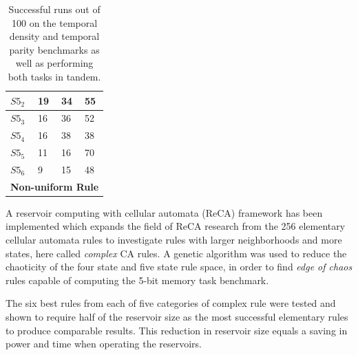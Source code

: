 \documentclass{elsarticle}
\begin{document}
\begin{multicols}{2}
\begin{table}[H]
\begin{tabular}{|l|l|l|l|}
$S5_{2}$ & 19 & 34 & 55 \\ \hline
$S5_{3}$ & 16 & 36 & 52 \\ \hline
$S5_{4}$ & 16 & 38 & 38 \\ \hline
$S5_{5}$ & 11 & 16 & 70 \\ \hline
$S5_{6}$ & 9 & 15 & 48 \\ \hline
\multicolumn{4}{|l|}{\textbf{Non-uniform Rule}} \\ \hline
\end{tabular}
\caption{Successful runs out of 100 on the temporal density and temporal parity 
   benchmarks as well as performing both tasks in tandem.
}
\label{table:results_temp_dens}
\end{table}

A reservoir computing with cellular automata (ReCA) framework has been 
implemented which expands the field of ReCA research from the 256 elementary 
cellular automata rules to investigate rules with larger neighborhoods and more 
states, here called \textit{complex} CA rules. A genetic algorithm was used to 
reduce the chaoticity of the four state and five state rule space, in order to 
find \textit{edge of chaos} rules capable of computing the 5-bit memory task 
benchmark. \par The six best rules from each of five categories of complex rule 
were tested and shown to require half of the reservoir size as the most 
successful elementary rules to produce comparable results. This reduction in 
reservoir size equals a saving in power and time when operating the reservoirs.  





\end{multicols}
\end{document}
